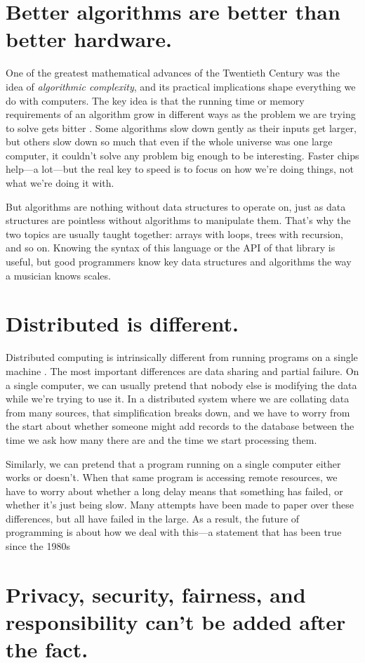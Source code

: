 \documentclass[10pt,letterpaper]{article}
\newcommand{\rulemajor}[1]{\section{#1}}
\begin{document}
\rulemajor{Better algorithms are better than better hardware.}

One of the greatest mathematical advances of the Twentieth Century was the idea
of \emph{algorithmic complexity}, and its practical implications shape
everything we do with computers.  The key idea is that the running time or
memory requirements of an algorithm grow in different ways as the problem we are
trying to solve gets bitter \cite{Cone2016}.  Some algorithms slow down gently
as their inputs get larger, but others slow down so much that even if the whole
universe was one large computer, it couldn't solve any problem big enough to be
interesting.  Faster chips help---a lot---but the real key to speed is to focus
on how we're doing things, not what we're doing it with.

But algorithms are nothing without data structures to operate on, just as data
structures are pointless without algorithms to manipulate them.  That's why the
two topics are usually taught together: arrays with loops, trees with recursion,
and so on.  Knowing the syntax of this language or the API of that library is
useful, but good programmers know key data structures and algorithms the way a
musician knows scales.

\rulemajor{Distributed is different.}

Distributed computing is intrinsically different from running programs on a
single machine \cite{Wald1994}.  The most important differences are data sharing
and partial failure.  On a single computer, we can usually pretend that nobody
else is modifying the data while we're trying to use it.  In a distributed
system where we are collating data from many sources, that simplification breaks
down, and we have to worry from the start about whether someone might add
records to the database between the time we ask how many there are and the time
we start processing them.

Similarly, we can pretend that a program running on a single computer either
works or doesn't. When that same program is accessing remote resources, we have
to worry about whether a long delay means that something has failed, or whether
it's just being slow.  Many attempts have been made to paper over these
differences, but all have failed in the large.  As a result, the future of
programming is about how we deal with this---a statement that has been true
since the 1980s

\rulemajor{Privacy, security, fairness, and responsibility can't be added after the fact.}
\end{document}
